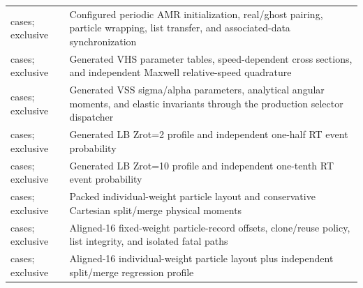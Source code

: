 \begin{longtable}{L{0.38\textwidth}L{0.51\textwidth}}
 cases; exclusive & Configured periodic AMR initialization, real/ghost pairing, particle wrapping, list transfer, and associated-data synchronization\newline{}\\
 cases; exclusive & Generated VHS parameter tables, speed-dependent cross sections, and independent Maxwell relative-speed quadrature\newline{}\\
 cases; exclusive & Generated VSS sigma/alpha parameters, analytical angular moments, and elastic invariants through the production selector dispatcher\newline{}\\
 cases; exclusive & Generated LB Zrot=2 profile and independent one-half RT event probability\newline{}\\
 cases; exclusive & Generated LB Zrot=10 profile and independent one-tenth RT event probability\newline{}\\
 cases; exclusive & Packed individual-weight particle layout and conservative Cartesian split/merge physical moments\newline{}\\
 cases; exclusive & Aligned-16 fixed-weight particle-record offsets, clone/reuse policy, list integrity, and isolated fatal paths\newline{}\\
 cases; exclusive & Aligned-16 individual-weight particle layout plus independent split/merge regression profile\newline{}\\

\end{longtable}
